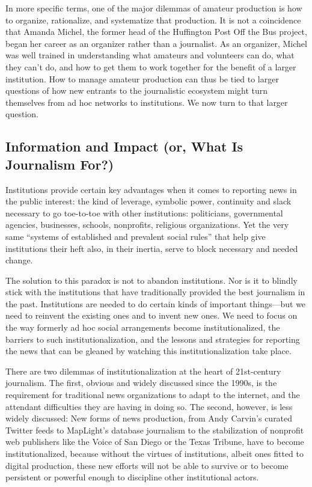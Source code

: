In more specific terms, one of the major dilemmas of amateur production is
how to organize, rationalize, and systematize that production. It is not a coincidence
that Amanda Michel, the former head of the Huffington Post Off the Bus
project, began her career as an organizer rather than a journalist. As an organizer,
Michel was well trained in understanding what amateurs and volunteers can do,
what they can’t do, and how to get them to work together for the benefit of a
larger institution. How to manage amateur production can thus be tied to larger
questions of how new entrants to the journalistic ecosystem might turn themselves
from ad hoc networks to institutions. We now turn to that larger question.

\subsection{Information and Impact (or, What Is Journalism For?)}
Institutions provide certain key advantages when it comes to reporting news in
the public interest: the kind of leverage, symbolic power, continuity and slack
necessary to go toe-to-toe with other institutions: politicians, governmental
agencies, businesses, schools, nonprofits, religious organizations. Yet the very same
``systems of established and prevalent social rules'' that help give institutions their
heft also, in their inertia, serve to block necessary and needed change.

The solution to this paradox is not to abandon institutions. Nor is it to blindly
stick with the institutions that have traditionally provided the best journalism in
the past. Institutions are needed to do certain kinds of important things—but we
need to reinvent the existing ones and to invent new ones. We need to focus on
the way formerly ad hoc social arrangements become institutionalized, the barriers
to such institutionalization, and the lessons and strategies for reporting the
news that can be gleaned by watching this institutionalization take place.

There are two dilemmas of institutionalization at the heart of 21st-century journalism.
The first, obvious and widely discussed since the 1990s, is the requirement
for traditional news organizations to adapt to the internet, and the attendant difficulties
they are having in doing so. The second, however, is less widely discussed:
New forms of news production, from Andy Carvin’s curated Twitter feeds to
MapLight’s database journalism to the stabilization of nonprofit web publishers
like the Voice of San Diego or the Texas Tribune, have to become institutionalized,
because without the virtues of institutions, albeit ones fitted to digital production,
these new efforts will not be able to survive or to become persistent or
powerful enough to discipline other institutional actors.

